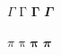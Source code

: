 \documentclass[12pt,a4paper]{article}
\begin{document}
$\Gamma$ $\mathrm{\Gamma}$ $\mathbf{\Gamma}$ $\mathbfit{\Gamma}$

$\pi$ $\mathrm{\pi}$ $\mathbf{\pi}$ $\mathbfit{\pi}$
\end{document}
